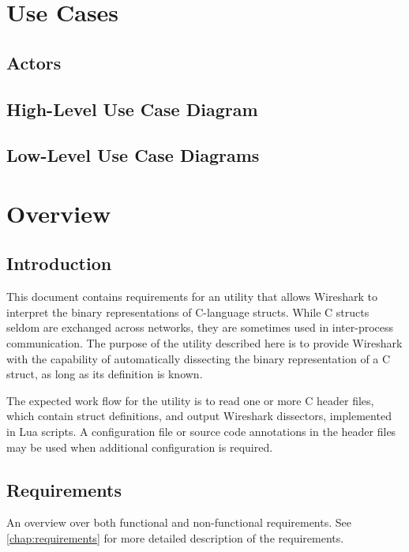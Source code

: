 \chapter{Use Cases}
\section{Actors}
\section{High-Level Use Case Diagram}
\section{Low-Level Use Case Diagrams}

\chapter{Overview}

\section{Introduction}
This document contains requirements for an utility that allows Wireshark to
interpret the binary representations of C-language structs. While C structs
seldom are exchanged across networks, they are sometimes used in inter-process
communication. The purpose of the utility described here is to provide
Wireshark with the capability of automatically dissecting the binary
representation of a C struct, as long as its definition is known.

The expected work flow for the utility is to read one or more C header files,
which contain struct definitions, and output Wireshark dissectors, implemented
in Lua scripts. A configuration file or source code annotations in the header
files may be used when additional configuration is required.

\section{Requirements}
An overview over both functional and non-functional requirements.
See \autoref{chap:requirements} for more detailed description of the requirements.

